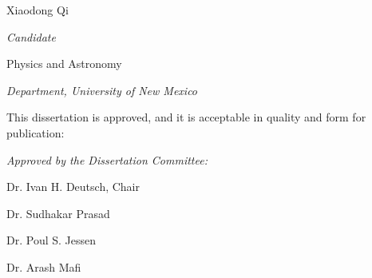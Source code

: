 \documentclass[letterpaper,10pt]{article}
\begin{document}
\vspace{0.8in}
\begin{Large}
 \noindent Xiaodong Qi 
 \vspace{-0.2in}
 \end{Large}

 \noindent\makebox[\linewidth][l]{\rule{2.8in}{1pt}}
  \textit{Candidate} \vspace{0.5in}
 
 \begin{Large}
 \noindent Physics and Astronomy
 \vspace{-0.2in}
 \end{Large}
 
  \noindent\makebox[\linewidth][l]{\rule{2.8in}{1pt}} 
    \textit{Department, University of New Mexico} \vspace{0.2in}


 
 
   \noindent This dissertation is approved, and it is acceptable in quality and form for publication: \vspace{0.2in}
\begin{large}
 \noindent \textit{Approved by the Dissertation Committee:} \vspace{0.45in}
 \end{large}
 
%  
%  
%  

 

 \noindent\makebox[\linewidth]{\rule{5.5in}{1pt}}
 
  \hfill Dr. Ivan H. Deutsch, Chair \vspace{0.35in}
  
  

  \noindent\makebox[\linewidth]{\rule{5.5in}{1pt}}
   
   \hfill Dr. Sudhakar Prasad  \vspace{0.35in}
 
 
  \noindent\makebox[\linewidth]{\rule{5.5in}{1pt}}
  
    \hfill Dr. Poul S. Jessen  \vspace{0.35in}
 
 

  \noindent\makebox[\linewidth]{\rule{5.5in}{1pt}}
    
    \hfill Dr. Arash Mafi  \vspace{0.35in}
    
      

 
\end{document}
